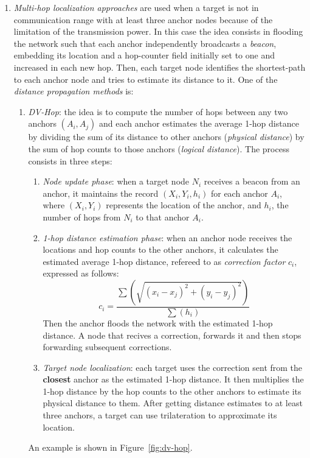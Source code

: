 \documentclass[a4paper,12pt]{article}
\begin{document}
\begin{enumerate}[label=(\alph*)]
\begin{enumerate}[label=(\roman*)]
  \end{enumerate}
  \item \textit{Multi-hop localization approaches} are used when a target is not in communication range with at least three anchor nodes because of the limitation of the transmission power. In this case the idea consists in flooding the network such that each anchor independently broadcasts a \textit{beacon}, embedding its location and a hop-counter field initially set to one and increased in each new hop. Then, each target node identifies the shortest-path to each anchor node and tries to estimate its distance to it. One of the \textit{distance propagation methods} is:
  \begin{enumerate}[label=(\roman*)]
    \item \textit{DV-Hop}: the idea is to compute the number of hops between any two anchors $(A_i, A_j)$ and each anchor estimates the average 1-hop distance by dividing the sum of its distance to other anchors (\textit{physical distance}) by the sum of hop counts to those anchors (\textit{logical distance}). The process consists in three steps:
    \begin{enumerate}[label=\arabic*.]
    	\item \textit{Node update phase}: when a target node $N_i$ receives a beacon from an anchor, it maintains the record $(X_i, Y_i, h_i)$ for each anchor $A_i$, where $(X_i, Y_i)$ represents the location of the anchor, and $h_i$, the number of hops from $N_i$ to that anchor $A_i$.
    	\item \textit{1-hop distance estimation phase}: when an anchor node receives the locations and hop counts to the other anchors, it calculates the estimated average 1-hop distance, refereed to as \textit{correction factor} $c_i$, expressed as follows:
    	\begin{equation}
    	c_i = \frac{\sum(\sqrt{(x_i - x_j)^2 + (y_i - y_j)^2})}{\sum{(h_i)}}
    	\end{equation}
    	Then the anchor floods the network with the estimated 1-hop distance. A node that recives a correction, forwards it and then stops forwarding subsequent corrections.
    	\item \textit{Target node localization}: each target uses the correction sent from the \textbf{closest} anchor as the estimated 1-hop distance. It then multiplies the 1-hop distance by the hop counts to the other anchors to estimate its physical distance to them. After getting distance estimates to at least three anchors, a target can use trilateration to approximate its location.
    \end{enumerate}
    An example is shown in Figure~\ref{fig:dv-hop}.


\end{enumerate}
\end{enumerate}
\end{document}
